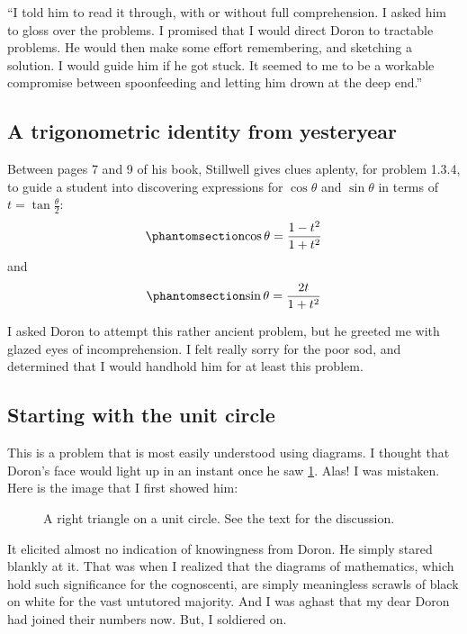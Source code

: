 \documentclass[
  a4paper,
]{article}
\begin{document}
``I told him to read it through, with or without full comprehension. I
asked him to gloss over the problems. I promised that I would direct
Doron to tractable problems. He would then make some effort remembering,
and sketching a solution. I would guide him if he got stuck. It seemed
to me to be a workable compromise between spoonfeeding and letting him
drown at the deep end.''

\subsection{A trigonometric identity from
yesteryear}\label{a-trigonometric-identity-from-yesteryear}

Between pages 7 and 9 of his book, Stillwell gives clues aplenty, for
problem 1.3.4, to guide a student into discovering expressions for
\(\cos\theta\) and \(\sin\theta\) in terms of
\(t = \tan\frac{\theta}{2}\):
\begin{equation}\phantomsection\label{eq:costheta}{
\cos\theta = \frac{1 - t^2}{1 + t^2}
}\end{equation} and \begin{equation}\phantomsection\label{eq:sintheta}{
\sin\theta = \frac{2t}{1 + t^2}
}\end{equation}

I asked Doron to attempt this rather ancient problem, but he greeted me
with glazed eyes of incomprehension. I felt really sorry for the poor
sod, and determined that I would handhold him for at least this problem.

\subsection{Starting with the unit
circle}\label{starting-with-the-unit-circle}

This is a problem that is most easily understood using diagrams. I
thought that Doron's face would light up in an instant once he saw
\cref{fig:pythagoras}. Alas! I was mistaken. Here is the image that I
first showed him:

\begin{figure}
\centering

\caption{A right triangle on a unit circle. See the text for the
discussion.}\label{fig:pythagoras}
\end{figure}

It elicited almost no indication of knowingness from Doron. He simply
stared blankly at it. That was when I realized that the diagrams of
mathematics, which hold such significance for the cognoscenti, are
simply meaningless scrawls of black on white for the vast untutored
majority. And I was aghast that my dear Doron had joined their numbers
now. But, I soldiered on.
\end{document}
